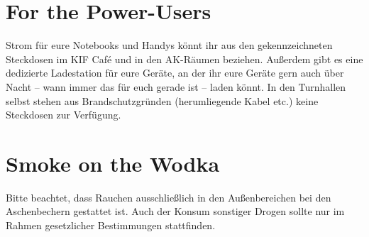 \section*{For the Power-Users}

Strom für eure Notebooks und Handys könnt ihr aus den gekennzeichneten Steckdosen im KIF Café und in den AK-Räumen beziehen.
Außerdem gibt es eine dedizierte Ladestation für eure Geräte, an der ihr eure Geräte gern auch über Nacht -- wann immer das für euch gerade ist -- laden könnt.
In den Turnhallen selbst stehen aus Brandschutzgründen (herumliegende Kabel etc.) keine Steckdosen zur Verfügung.

\section*{Smoke on the Wodka}

Bitte beachtet, dass Rauchen ausschließlich in den Außenbereichen bei den Aschenbechern gestattet ist.
Auch der Konsum sonstiger Drogen sollte nur im Rahmen gesetzlicher Bestimmungen stattfinden.
